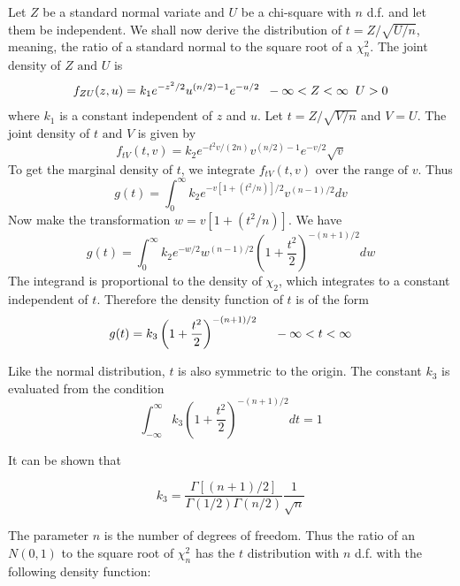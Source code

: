 \documentclass{article}
\begin{document}
Let \(Z\) be a standard normal variate and \(U\) be a chi-square with \(n\) d.f. and let them be independent. We shall now derive the distribution of \(t=Z/\sqrt{U/n}\), meaning, the ratio of a standard normal to the square root of a \(\chi_n^2\). The joint density of \(Z \text{ and } U\) is
\begin{equation*}
    f_{ZU}(z,u)=k_1 e^{-z^2/2}u^{(n/2)-1}e^{-u/2} \hspace{0.2cm} -\infty<Z<\infty \hspace{0.2cm} U>0
\end{equation*}
where \(k_1\) is a constant independent of \(z\) and \(u\). Let \(t=Z/\sqrt{V/n}\) and \(V=U\). The joint density of \(t \text{ and } V\) is given by
\begin{equation*}
    f_{tV}(t,v)=k_2 e^{-t^2v/(2n)}v^{(n/2)-1}e^{-v/2}\sqrt{v}
\end{equation*}
To get the marginal density of \(t\), we integrate \(f_{tV}(t,v) \text{ over the range of } v\). Thus
\begin{equation*}
    g(t)=\int_0^{\infty} k_2 e^{-v[1+(t^2/n)]/2} v^{(n-1)/2} dv
\end{equation*}
Now make the transformation \(w=v[1+(t^2/n)]\). We have
\begin{equation*}
    g(t)=\int_0^{\infty} k_2 e^{-w/2} w^{(n-1)/2} \left(1+\frac{t^2}{2}\right)^{-(n+1)/2} dw
\end{equation*}
The integrand is proportional to the density of \(\chi_2\), which integrates to a constant independent of \(t\). Therefore the density function of \(t\) is of the form
\begin{equation*}
    g(t)=k_3\left(1+\frac{t^2}{2}\right)^{-(n+1)/2} \hspace{0.5cm} -\infty<t<\infty
\end{equation*}

Like the normal distribution, \(t\) is also symmetric to the origin. The constant \(k_3\) is evaluated from the condition 
\begin{equation*}
    \int_{-\infty}^{\infty}k_3\left(1+\frac{t^2}{2}\right)^{-(n+1)/2}dt=1
\end{equation*}

It can be shown that

\begin{equation*}
    k_3=\frac{\Gamma[(n+1)/2]}{\Gamma(1/2)\Gamma(n/2)} \frac{1}{\sqrt{n}}
\end{equation*}

The parameter \(n\) is the number of degrees of freedom. Thus the ratio of an \(N(0,1)\) to the square root of \(\chi_n^2\) has the \(t\) distribution with \(n\) d.f. with the following density function:
\end{document}
